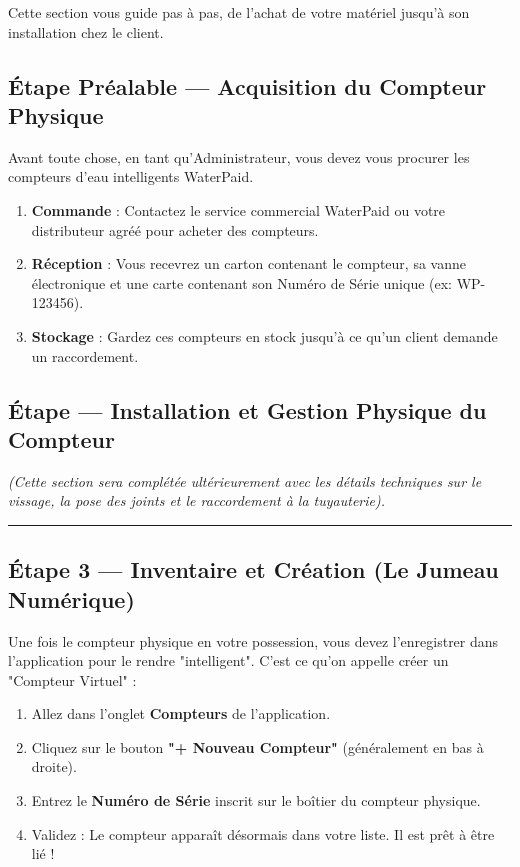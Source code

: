\documentclass[a4paper,12pt]{report}
\begin{document}
Cette section vous guide pas à pas, de l'achat de votre matériel jusqu'à son installation chez le client.

\subsection{Étape Préalable — Acquisition du Compteur Physique}
Avant toute chose, en tant qu'Administrateur, vous devez vous procurer les compteurs d'eau intelligents WaterPaid.
\begin{enumerate}
    \item \textbf{Commande} : Contactez le service commercial WaterPaid ou votre distributeur agréé pour acheter des compteurs.
    \item \textbf{Réception} : Vous recevrez un carton contenant le compteur, sa vanne électronique et une carte contenant son Numéro de Série unique (ex: WP-123456).
    \item \textbf{Stockage} : Gardez ces compteurs en stock jusqu'à ce qu'un client demande un raccordement.
\end{enumerate}

\subsection{Étape — Installation et Gestion Physique du Compteur}
\textit{(Cette section sera complétée ultérieurement avec les détails techniques sur le vissage, la pose des joints et le raccordement à la tuyauterie).}
\vspace{2cm} %
\noindent\rule{\linewidth}{0.4pt}

\subsection{Étape 3 — Inventaire et Création (Le Jumeau Numérique)}
Une fois le compteur physique en votre possession, vous devez l'enregistrer dans l'application pour le rendre "intelligent".
C'est ce qu'on appelle créer un "Compteur Virtuel" :
\begin{enumerate}
    \item Allez dans l'onglet \textbf{Compteurs} de l'application.
    \item Cliquez sur le bouton \textbf{"+ Nouveau Compteur"} (généralement en bas à droite).
    \item Entrez le \textbf{Numéro de Série} inscrit sur le boîtier du compteur physique.
    \item Validez : Le compteur apparaît désormais dans votre liste. Il est prêt à être lié !
\end{enumerate}
\end{document}
